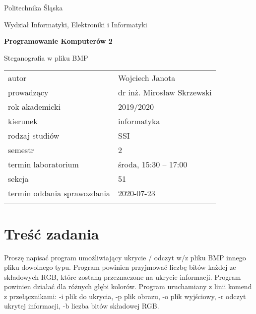 \documentclass[12pt,a4paper,twoside]{article}
\newcounter{rok}
\begin{document}
\frenchspacing
\thispagestyle{empty}
\begin{center}
{\Large\sf Politechnika Śląska   %

Wydział Informatyki, Elektroniki i Informatyki

}

\vfill

 

\vfill\vfill

{\Huge\sffamily\bfseries Programowanie Komputerów 2\par}  

\vfill\vfill

{\LARGE\sf Steganografia w pliku BMP}   


\vfill \vfill\vfill\vfill






\begin{tabular}{ll}
	\toprule
	autor                       & Wojciech Janota     \\
	prowadzący                  & dr inż. Mirosław Skrzewski  \\
	rok akademicki              & 2019/2020         \\
	kierunek                    & informatyka            \\
	rodzaj studiów              & SSI                    \\
	semestr                     & 2                      \\
	termin laboratorium         & środa, 15:30 -- 17:00 \\
	sekcja                      & 51                     \\
	termin oddania sprawozdania & 2020-07-23             \\
	\bottomrule
	                            &
\end{tabular}

\end{center}

\cleardoublepage

\section{Treść zadania}
Proszę napisać program umożliwiający ukrycie / odczyt w/z pliku BMP innego pliku dowolnego typu.
Program powinien przyjmować liczbę bitów każdej ze składowych RGB, które zostaną przeznaczone na ukrycie informacji.
Program powinien działać dla różnych głębi kolorów. Program uruchamiany z linii
komend z przełącznikami: -i plik do ukrycia, -p plik obrazu, -o plik wyjściowy, -r odczyt ukrytej informacji, -b liczba bitów składowej RGB.
\end{document}
